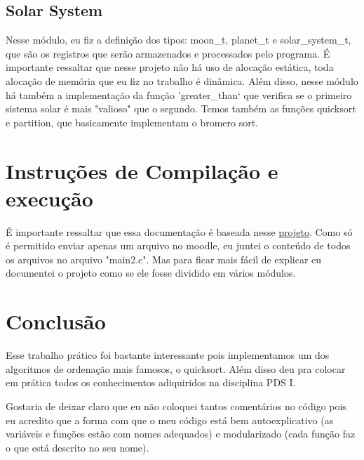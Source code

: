 \documentclass[11pt]{article}
\begin{document}
    \subsection{Solar System}
        \par Nesse módulo, eu fiz a definição dos tipos: moon\_t, planet\_t e solar\_system\_t, que são os registros que serão armazenados e processados pelo programa. É importante ressaltar que nesse projeto não há uso de alocação estática, toda alocação de memória que eu fiz no trabalho é dinâmica. Além disso, nesse módulo há também a implementação da função 'greater\_than` que verifica se o primeiro sistema solar é mais "valioso" que o segundo. Temos também as funções quicksort e partition, que basicamente implementam o bromero sort.

        


\section{Instruções de Compilação e execução}

    \par É importante ressaltar que essa documentação é baseada nesse \href{https://github.com/ullas-college-projects/Pds1-pratical-work}{projeto}. Como só é permitido enviar apenas um arquivo no moodle, eu juntei o conteúdo de todos os arquivos no arquivo "main2.c". Mas para ficar mais fácil de explicar eu documentei o projeto como se ele fosse dividido em vários módulos.

    


\section{Conclusão}

    \par Esse trabalho prático foi bastante interessante pois implementamos um dos algoritmos de ordenação mais famosos, o quicksort. Além disso deu pra colocar em prática todos os conhecimentos adiquiridos na disciplina PDS I. 

    \par Gostaria de deixar claro que eu não coloquei tantos comentários no código pois eu acredito que a forma com que o meu código está bem autoexplicativo (as variáveis e funções estão com nomes adequados) e modularizado (cada função faz o que está descrito no seu nome).

\end{document}
